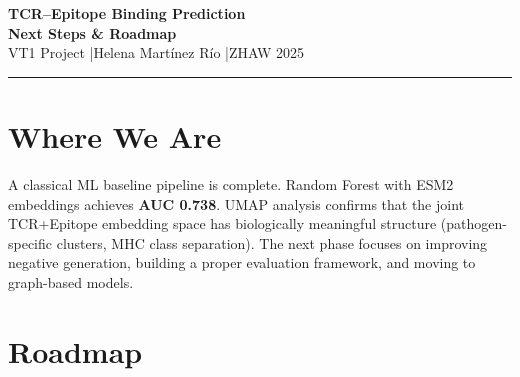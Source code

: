 \documentclass[11pt,a4paper]{article}
\begin{document}
\begin{center}
  {\LARGE\bfseries\color{mainblue} TCR--Epitope Binding Prediction}\\[6pt]
  {\large\bfseries\color{darkgray} Next Steps \& Roadmap}\\[8pt]
  {\small\color{gray} VT1 Project \quad|\quad Helena Mart\'inez R\'io \quad|\quad ZHAW 2025}
\end{center}

\vspace{6pt}
\textcolor{mainblue}{\rule{\linewidth}{1.5pt}}
\vspace{12pt}

\section{Where We Are}

A classical ML baseline pipeline is complete.
Random Forest with ESM2 embeddings achieves \textbf{AUC 0.738}.
UMAP analysis confirms that the joint TCR+Epitope embedding space has
biologically meaningful structure (pathogen-specific clusters, MHC class separation).
The next phase focuses on improving negative generation, building a proper
evaluation framework, and moving to graph-based models.

\section{Roadmap}
\end{document}
